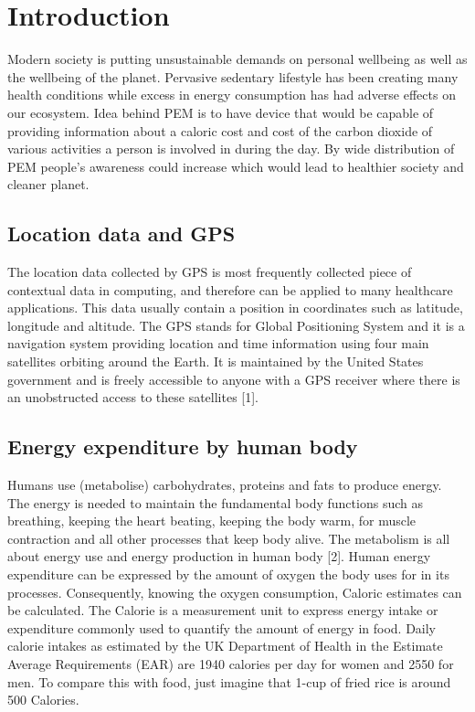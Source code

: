 \documentclass[12pt, a4paper]{report}   %
\begin{document}
\chapter{Introduction}
Modern society is putting unsustainable demands on personal wellbeing as well as the wellbeing of the planet. Pervasive sedentary lifestyle has been creating many health conditions while excess in energy consumption has had adverse effects on our ecosystem. Idea behind PEM is to have device that would be capable of providing information about a caloric cost and cost of the carbon dioxide of various activities a person is involved in during the day. By wide distribution of PEM people's awareness could increase which would lead to healthier society and cleaner planet.\\

\section{Location data and GPS}
The location data collected by GPS is most frequently collected piece of contextual data in computing, and therefore can be applied to many healthcare applications. This data usually contain a position in coordinates such as latitude, longitude and altitude. The GPS stands for Global Positioning System and it is a navigation system providing location and time information using four main satellites orbiting around the Earth. It is maintained by the United States government and is freely accessible to anyone with a GPS receiver where there is an unobstructed access to these satellites [1].\\

\section{Energy expenditure by human body}
Humans use (metabolise) carbohydrates, proteins and fats to produce energy. The energy is needed to maintain the fundamental body functions such as breathing, keeping the heart beating, keeping the body warm, for muscle contraction and all other processes that keep body alive. The metabolism is all about energy use and energy production in human body [2].
Human energy expenditure can be expressed by the amount of oxygen the body uses for in its processes. Consequently, knowing the oxygen consumption, Caloric estimates can be calculated. The Calorie is a measurement unit to express energy intake or expenditure commonly used to quantify the amount of energy in food. 
Daily calorie intakes as estimated by the UK Department of Health in the Estimate Average Requirements (EAR) are 1940 calories per day for women and 2550 for men. To compare this with food, just imagine that 1-cup of fried rice is around 500 Calories.\\
\end{document}
